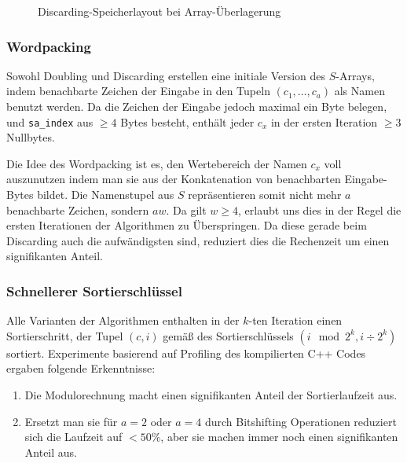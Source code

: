 \begin{figure}
\caption{Discarding-Speicherlayout bei Array-Überlagerung}
\label{fig:doubling:opt:discardlagerung}
\end{figure}

\subsubsection{Wordpacking}

Sowohl Doubling und Discarding erstellen eine initiale Version des $S$-Arrays, indem benachbarte Zeichen der Eingabe in den Tupeln $(c_1, \dots, c_a)$ als Namen benutzt werden. Da die Zeichen der Eingabe jedoch maximal ein Byte belegen, und \texttt{sa\_index} aus $\ge 4$ Bytes besteht, enthält jeder $c_x$ in der ersten Iteration $\ge 3$ Nullbytes.

Die Idee des Wordpacking ist es, den Wertebereich der Namen $c_x$ voll auszunutzen indem man sie aus der Konkatenation von benachbarten Eingabe-Bytes bildet. Die Namenstupel aus $S$ repräsentieren somit nicht mehr $a$ benachbarte Zeichen, sondern $aw$. Da gilt $w \ge 4$, erlaubt uns dies in der Regel die ersten Iterationen der Algorithmen zu Überspringen. Da diese gerade beim Discarding auch die aufwändigsten sind, reduziert dies die Rechenzeit um einen signifikanten Anteil.

\subsubsection{Schnellerer Sortierschlüssel}

Alle Varianten der Algorithmen enthalten in der $k$-ten Iteration einen Sortierschritt, der Tupel $(c, i)$ gemäß des Sortierschlüssels $(i \mod 2^k, i \div 2^k)$ sortiert. Experimente basierend auf Profiling des kompilierten C++ Codes ergaben folgende Erkenntnisse:

\begin{enumerate}
\item Die Modulorechnung macht einen signifikanten Anteil der Sortierlaufzeit aus.
\item Ersetzt man sie für $a = 2$ oder $a = 4$ durch Bitshifting Operationen reduziert sich die Laufzeit auf $< 50\%$, aber sie machen immer noch einen signifikanten Anteil aus.
\end{enumerate}

